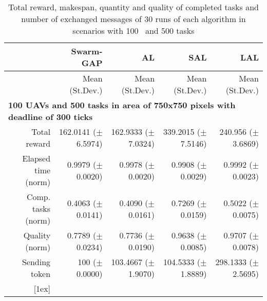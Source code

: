 \begin{table}%
	\small
	\fontsize{6}{6}\selectfont
	\centering
	\caption{Total reward, makespan, quantity and quality of completed tasks and number of exchanged messages of 30 runs of each algorithm in scenarios with 100 \uavs\ and 500 tasks}
	\label{table:500tasks}
	
	\begin{tabular}{rrrrr} \hline
		& Swarm-GAP
		& AL
		& SAL
		& LAL \\ \hline 
		
		& Mean (St.Dev.) & Mean (St.Dev.)  & Mean (St.Dev.)  & Mean (St.Dev.)  \\ [1ex]
		
		\multicolumn{5}{l}{\textbf{100 UAVs and 500 tasks in area of 750x750 pixels with deadline of 300 ticks}} \\
		Total reward           &  162.0141  ($\pm$6.5974) &  162.9333  ($\pm$7.0324)   &  339.2015  ($\pm$7.5146)  &  240.956   ($\pm$3.6869)   \\
		Elapsed time (norm)    &  0.9979    ($\pm$0.0020) &  0.9978    ($\pm$0.0020)   &  0.9908    ($\pm$0.0029)  &  0.9992    ($\pm$0.0023)   \\ 
		Comp. tasks (norm)     &  0.4063    ($\pm$0.0141) &  0.4090    ($\pm$0.0161)   &  0.7269    ($\pm$0.0159)  &  0.5022    ($\pm$0.0075)   \\ 
		Quality (norm)         &  0.7789    ($\pm$0.0234) &  0.7736    ($\pm$0.0190)   &  0.9638    ($\pm$0.0085)  &  0.9707    ($\pm$0.0078)   \\ 
		Sending token          &  100       ($\pm$0.0000) &  103.4667  ($\pm$1.9070)   &  104.5333  ($\pm$1.8889)  &  298.1333  ($\pm$2.5695)   \\ 
		[1ex]	\hline
		

\end{tabular}
\end{table}
